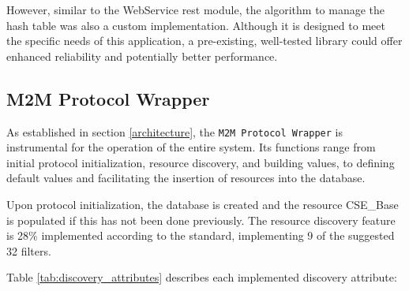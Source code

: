 \documentclass[a4paper,fleqn]{cas-dc}
\begin{document}
However, similar to the WebService \gls{rest} module, the algorithm to manage the hash table was also a custom implementation. Although it is designed to meet the specific needs of this application, a pre-existing, well-tested library could offer enhanced reliability and potentially better performance.

\subsection{M2M Protocol Wrapper}

As established in section \ref{architecture}, the \texttt{M2M Protocol Wrapper} is instrumental for the operation of the entire system. Its functions range from initial protocol initialization, resource discovery, and building values, to defining default values and facilitating the insertion of resources into the database.

Upon protocol initialization, the database is created and the resource CSE\_Base is populated if this has not been done previously. The resource discovery feature is 28\% implemented according to the standard, implementing 9 of the suggested 32 filters.

Table \ref{tab:discovery_attributes} describes each implemented discovery attribute:
\end{document}
